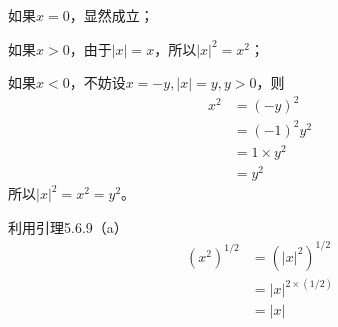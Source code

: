 \documentclass{article}
\theoremstyle{mystyle}
\begin{document}
如果$x = 0$，显然成立；

如果$x > 0$，由于$|x|=x$，所以$|x|^2 = x^2$；

如果$x < 0$，不妨设$x = -y, |x|=y, y > 0$，则
\begin{align*}
  x^2 & = (-y)^2       \\
      & = (-1)^2y^2    \\
      & = 1 \times y^2 \\
      & = y^2
\end{align*}
所以$|x|^2 = x^2 = y^2$。

利用引理5.6.9（a）
\begin{align*}
  (x^2)^{1/2} & = (|x|^2)^{1/2}      \\
              & = |x|^{2 \times (1/2)} \\
              & = |x|
\end{align*}
\end{document}

